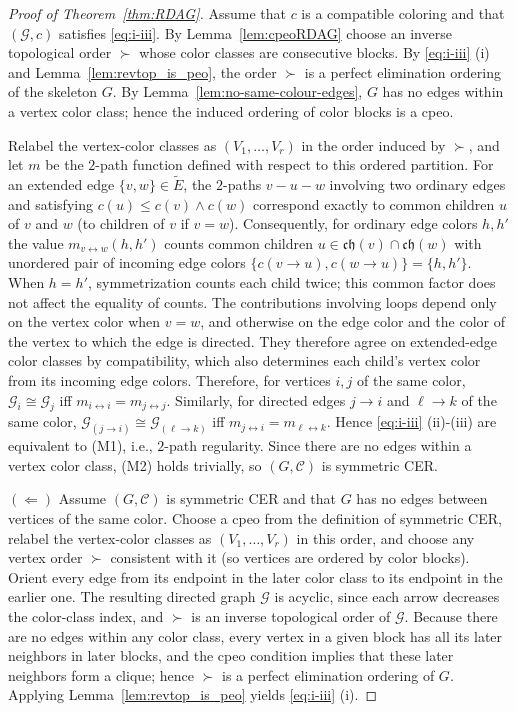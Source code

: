 \documentclass[10pt,a4paper]{amsart}
\newcommand{\1}{\mathbf{1}}
\def\ch{{\mathfrak{ch}}}
\theoremstyle{plain}
\theoremstyle{definition}
\theoremstyle{remark}
\begin{document}
\begin{proof}[Proof of Theorem~\ref{thm:RDAG}]
\noindent{$(\Rightarrow)$}
Assume that $c$ is a compatible coloring and that $(\mathcal{G},c)$ satisfies \eqref{eq:i-iii}.
By Lemma~\ref{lem:cpeoRDAG} choose an inverse topological order $\succ$ whose color classes are consecutive blocks. 
By \eqref{eq:i-iii} (i) and Lemma~\ref{lem:revtop_is_peo}, the order $\succ$ is a perfect elimination ordering of the skeleton $G$.
By Lemma~\ref{lem:no-same-colour-edges}, $G$ has no edges within a vertex color class; hence the induced ordering of color blocks
is a cpeo.

Relabel the vertex-color classes as $(V_1,\ldots,V_r)$ in the order induced by $\succ$, and let $m$ be the $2$-path function defined with respect to this ordered partition.
For an extended edge $\{v,w\}\in\tilde E$, the $2$-paths
$v-u-w$ involving two ordinary edges and satisfying
$c(u)\le c(v)\wedge c(w)$ correspond exactly to common
children $u$ of $v$ and $w$ (to children of $v$ if $v=w$).
Consequently, for ordinary edge colors $h,h'$ the value $m_{v\leftrightarrow w}(h,h')$ counts common children $u\in\ch(v)\cap\ch(w)$
with unordered pair of incoming edge colors $\{c(v\to u),c(w\to u)\}=\{h,h'\}$.
When $h=h'$, symmetrization counts each child twice;
this common factor does not affect the equality of counts.
The contributions involving loops depend only on the vertex
color when $v=w$, and otherwise on the edge color and the
color of the vertex to which the edge is directed.
They therefore agree on extended-edge color
classes by compatibility, which also determines each child's
vertex color from its incoming edge colors.
Therefore, for vertices $i,j$ of the same color,
$\mathcal{G}_i\cong\mathcal{G}_j$ iff $m_{i\leftrightarrow i}=m_{j\leftrightarrow j}$.
Similarly, for directed edges $j\to i$ and $\ell\to k$ of the same color,
$\mathcal{G}_{(j\to i)}\cong\mathcal{G}_{(\ell\to k)}$ iff $m_{j\leftrightarrow i}=m_{\ell\leftrightarrow k}$.
Hence \eqref{eq:i-iii} (ii)-(iii) are equivalent to (M1), i.e., $2$-path regularity.
Since there are no edges within a vertex color class, (M2) holds trivially, so $(G,\mathcal{C})$ is symmetric CER.

\noindent$(\Leftarrow)$
Assume $(G,\mathcal{C})$ is symmetric CER and that $G$ has no edges between vertices of the same color.
Choose a cpeo from the definition of symmetric CER, relabel the vertex-color classes as $(V_1,\ldots,V_r)$ in this order, and choose any vertex order $\succ$ consistent with it
(so vertices are ordered by color blocks).
Orient every edge from its endpoint in the later color class to its endpoint in the earlier one.
The resulting directed graph $\mathcal G$ is acyclic, since each arrow decreases the color-class index, and $\succ$ is an inverse topological order of $\mathcal G$.
Because there are no edges within any color class, every vertex in a given block has all its later neighbors in later blocks,
and the cpeo condition implies that these later neighbors form a clique; hence $\succ$ is a perfect elimination ordering of $G$.
Applying Lemma~\ref{lem:revtop_is_peo} yields \eqref{eq:i-iii} (i).


\end{proof}
\end{document}
